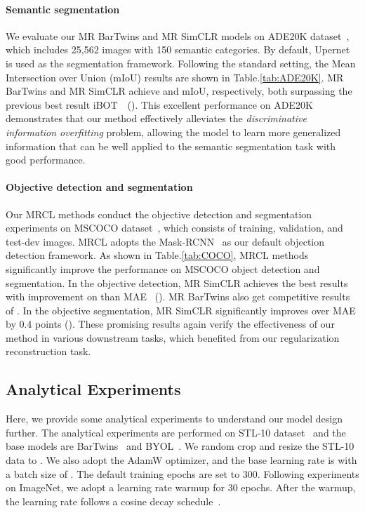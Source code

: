 \documentclass[10pt,twocolumn,letterpaper]{article}
\begin{document}
\paragraph{Semantic segmentation} We evaluate our MR BarTwins and MR SimCLR models on ADE20K dataset~\cite{zhou2019semantic}, which includes 25,562 images with 150 semantic categories. By default, Upernet~\cite{xiao2018unified} is used as the segmentation framework. Following the standard setting, the Mean Intersection over Union (mIoU) results are shown in Table.\ref{tab:ADE20K}. MR BarTwins and MR SimCLR achieve  and  mIoU, respectively, both surpassing the previous best result iBOT~\cite{zhou2021ibot}~(). This excellent performance on ADE20K demonstrates that our method effectively alleviates the \textit{discriminative information overfitting} problem, allowing the model to learn more generalized information that can be well applied to the semantic segmentation task with good performance.
\paragraph{Objective detection and segmentation} Our MRCL methods conduct the objective detection and segmentation experiments on MSCOCO dataset~\cite{lin2014microsoft}, which consists of  training,  validation, and  test-dev images. MRCL adopts the Mask-RCNN~\cite{he2017mask} as our default objection detection framework. As shown in Table.\ref{tab:COCO}, MRCL methods significantly improve the performance on MSCOCO object detection and segmentation. In the objective detection, MR SimCLR achieves the best results with  improvement on  than MAE~\cite{he2022masked} (). MR BarTwins also get competitive results of . In the objective segmentation, MR SimCLR significantly improves  over MAE by 0.4 points (). These promising results again verify the effectiveness of our method in various downstream tasks, which benefited from our regularization reconstruction task.
\subsection{Analytical Experiments}
Here, we provide some analytical experiments to understand our model design further. The analytical experiments are performed on STL-10 dataset~\cite{coates2011analysis} and the base models are BarTwins~\cite{zbontar2021barlow} and BYOL~\cite{grill2020bootstrap}. We random crop and resize the STL-10 data to . We also adopt the AdamW optimizer, and the base learning rate is  with a batch size of . The default training epochs are set to 300. Following experiments on ImageNet, we adopt a learning rate warmup for 30 epochs. After the warmup, the learning rate follows a cosine decay schedule~\cite{loshchilov2016sgdr}.
\end{document}
